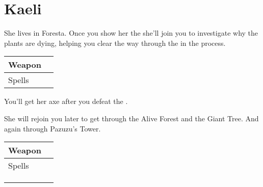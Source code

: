 \section{Kaeli}
\label{char:kaeli}


She lives in Foresta. Once you show her the  she'll join you to investigate why the plants are dying, helping you clear the way through the  in the process.

\bigskip
\begin{tabular}{ l | l }
	Weapon & \nameref{weapon:axe} \\
	\hline
	Spells & \nameref{spell:life}
\end{tabular}
\bigskip

You'll get her axe after you defeat the .

\vspace{1em}

She will rejoin you later to get through the Alive Forest and the Giant Tree. And again through Pazuzu's Tower.

\bigskip
\begin{tabular}{ l | l }
	Weapon & \nameref{weapon:giants_axe} \\
	\hline
	Spells & \nameref{spell:cure} \\
	& \nameref{spell:heal} \\
	& \nameref{spell:life} \\
	& \nameref{spell:aero}
\end{tabular}
\bigskip

